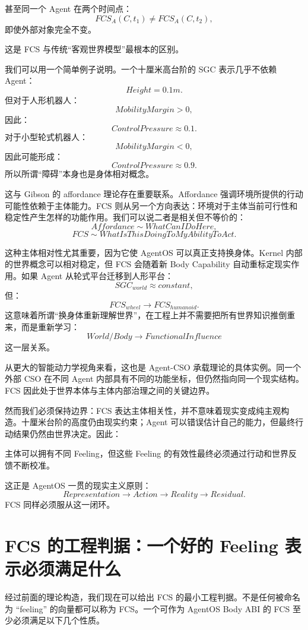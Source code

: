 甚至同一个 Agent 在两个时间点：
\[
FCS_A(C,t_1)
\neq
FCS_A(C,t_2),
\]
即使外部对象完全不变。

这是 FCS 与传统“客观世界模型”最根本的区别。

我们可以用一个简单例子说明。一个十厘米高台阶的 SGC 表示几乎不依赖 Agent：
\[
Height=0.1m.
\]
但对于人形机器人：
\[
MobilityMargin>0,
\]
因此：
\[
ControlPressure\approx0.1.
\]
对于小型轮式机器人：
\[
MobilityMargin<0,
\]
因此可能形成：
\[
ControlPressure\approx0.9.
\]
所以所谓“障碍”本身也是身体相对概念。

这与 Gibson 的 affordance 理论存在重要联系。Affordance 强调环境所提供的行动可能性依赖于主体能力。FCS 则从另一个方向表达：环境对于主体当前可行性和稳定性产生怎样的功能作用。我们可以说二者是相关但不等价的：
\[
Affordance
\sim
WhatCanIDoHere,
\]
\[
FCS
\sim
WhatIsThisDoingToMyAbilityToAct.
\]

这种主体相对性尤其重要，因为它使 AgentOS 可以真正支持换身体。Kernel 内部的世界概念可以相对稳定，但 FCS 会随着新 Body Capability 自动重标定现实作用。如果 Agent 从轮式平台迁移到人形平台：
\[
SGC_{world}
\approx
constant,
\]
但：
\[
FCS_{wheel}
\rightarrow
FCS_{humanoid}.
\]
这意味着所谓“换身体重新理解世界”，在工程上并不需要把所有世界知识推倒重来，而是重新学习：
\[
World/Body
\rightarrow
FunctionalInfluence
\]
这一层关系。

从更大的智能动力学视角来看，这也是 Agent-CSO 承载理论的具体实例。同一个外部 CSO 在不同 Agent 内部具有不同的功能坐标，但仍然指向同一个现实结构。FCS 因此处于世界本体与主体内部治理之间的关键边界。

然而我们必须保持边界：FCS 表达主体相关性，并不意味着现实变成纯主观构造。十厘米台阶的高度仍由现实约束；Agent 可以错误估计自己的能力，但最终行动结果仍然由世界决定。因此：
\begin{statementbox}
\centering
{}
\end{statementbox}
主体可以拥有不同 Feeling，但这些 Feeling 的有效性最终必须通过行动和世界反馈不断校准。

这正是 AgentOS 一贯的现实主义原则：
\[
Representation
\rightarrow
Action
\rightarrow
Reality
\rightarrow
Residual.
\]
FCS 同样必须服从这一闭环。

\section{FCS 的工程判据：一个好的 Feeling 表示必须满足什么}

经过前面的理论构造，我们现在可以给出 FCS 的最小工程判据。不是任何被命名为 ``feeling'' 的向量都可以称为 FCS。一个可作为 AgentOS Body ABI 的 FCS 至少必须满足以下几个性质。

